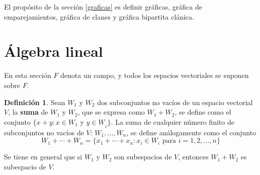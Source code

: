 \documentclass[12pt]{book}
\newtheorem{theorem}{Teorema}[section]
\theoremstyle{definition}
\newtheorem{definition}[theorem]{Definición}
\newcounter{in}
\newcounter{ini}
\begin{document}
El propósito de la sección \ref{graficas} es definir gráficas,
gráfica de emparejamientos, gráfica de clanes y gráfica bipartita
clánica.


\section{Álgebra lineal}
\label{esp-vec}

En esta sección $F$ denota un campo, y todos los espacios vectoriales
se suponen sobre $F$.


\begin{definition}
  Sean $W_{1}$ y $W_{2}$ dos subconjuntos no vacíos de un espacio
  vectorial $V$, la \textbf{suma} de $W_{1}$ y $W_{2}$, que se
  expresa como $W_{1}+W_{2}$, se define como el conjunto $\{x+y:x\in W_{1}$ y $y\in
  W_{_2}\}$. La suma de cualquier número finito de subconjuntos no
  vacíos de $V$: $W_{1},\ldots,W_{n}$, se define análogamente como el
  conjunto
  $$W_{1}+\cdots+W_{n}=\{x_{1}+\cdots+x_{n}: x_{i}\in W_{i} \mbox{ para }i=1,2,\ldots,n\}$$
\end{definition}

Se tiene en general que si $W_{1}$ y $W_{2}$ son subespacios de $V$,
entonces $W_{1}+W_{2}$ es subespacio de $V$.
\end{document}
